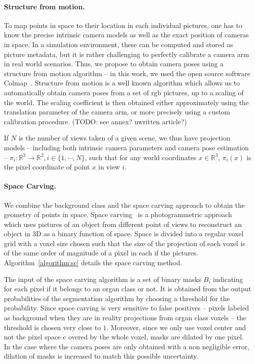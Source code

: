 \paragraph{Structure from motion.} To map points in space to their location in each
individual pictures, one has to know the precise intrinsic camera models as well
as the exact position of cameras in space. In a simulation environment,
these can be computed and stored as picture metadata, but it is rather
challenging to perfectly calibrate a camera arm in real world scenarios. Thus,
we propose to obtain camera poses using a structure from motion algorithm -- in
this work, we used the open source software Colmap~\cite{schoenberger2016mvs,
schoenberger2016sfm}. Structure from motion is a well known algorithm which
allows us to automatically obtain camera poses from a set of rgb pictures, up to
a scaling of the world. The scaling coefficient is then obtained either
approximately using the translation parameter of the camera arm, or more
precisely using a custom calibration procedure. (TODO: see annex? uwritten article?)

If $N$ is the number of views taken of a given scene,
we thus have projection models -- including both intrinsic camera parameters
and camera pose estimation -- $\pi_i : \mathbb{R}^3 \rightarrow \mathbb{R}^2,i \in \{1,\cdots, N\}$,
such that for any world coordinates $x \in \mathbb{R}^3$, $\pi_i ({x})$ is the
pixel coordinate of point ${x}$ in view $i$.

\paragraph{Space Carving.} We combine the background class and the space carving
approach to obtain the geometry of points in space. Space carving~\cite{kutulakos_theory_1999}
is a photogrammetric approach which uses
pictures of an object from different point of views to reconstruct
an object in 3D as a binary function of space. Space is divided into a regular voxel grid with a voxel size chosen
such that the size of the projection of each voxel is of the same order of magnitude of a pixel in each
if the pictures. Algorithm~\ref{algorithm:sc} details the space carving method.

The input of the space carving algorithm is a set of binary masks $B_i$
indicating for each pixel if it belongs to an organ class or not. It is
obtained from the output probabilities of the segmentation algorithm
by choosing a threshold for the probability. Since space carving is very
sensitive to false positives -- pixels labeled as background when they are in
reality projections from organ class voxels -- the threshold is chosen very
close to $1$. Moreover, since we only use voxel center and not the pixel space c
overed by the whole voxel, masks are dilated by one pixel. In the case where
the camera poses are only obtained with a non negligible error,
dilation of masks is increased to match this possible uncertainty.

